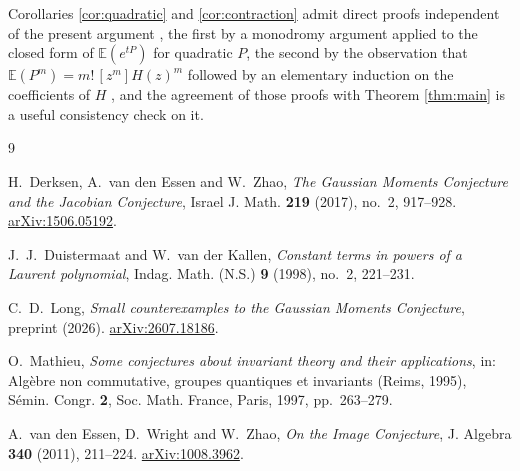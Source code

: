 \documentclass[11pt]{amsart}
\theoremstyle{plain}
\theoremstyle{remark}
\numberwithin{equation}{section}
\newcommand{\E}{\mathbb{E}}
\begin{document}
Corollaries \ref{cor:quadratic} and \ref{cor:contraction} admit direct proofs
independent of the present argument ,  the first by a monodromy argument
applied to the closed form of $\E(e^{tP})$ for quadratic $P$, the second by the
observation that $\E(P^m)=m!\,[z^m]H(z)^m$ followed by an elementary induction
on the coefficients of $H$ ,  and the agreement of those proofs with Theorem
\ref{thm:main} is a useful consistency check on it.

\begin{thebibliography}{9}

H.~Derksen, A.~van den Essen and W.~Zhao,
\emph{The Gaussian Moments Conjecture and the Jacobian Conjecture},
Israel J. Math. \textbf{219} (2017), no.~2, 917--928.
\href{https://arxiv.org/abs/1506.05192}{arXiv:1506.05192}.

J.~J.~Duistermaat and W.~van der Kallen,
\emph{Constant terms in powers of a Laurent polynomial},
Indag. Math. (N.S.) \textbf{9} (1998), no.~2, 221--231.

C.~D.~Long,
\emph{Small counterexamples to the Gaussian Moments Conjecture},
preprint (2026).
\href{https://arxiv.org/abs/2607.18186}{arXiv:2607.18186}.

O.~Mathieu,
\emph{Some conjectures about invariant theory and their applications},
in: Alg\`ebre non commutative, groupes quantiques et invariants (Reims, 1995),
S\'emin. Congr. \textbf{2}, Soc. Math. France, Paris, 1997, pp.~263--279.

A.~van den Essen, D.~Wright and W.~Zhao,
\emph{On the Image Conjecture},
J. Algebra \textbf{340} (2011), 211--224.
\href{https://arxiv.org/abs/1008.3962}{arXiv:1008.3962}.

\end{thebibliography}
\end{document}
